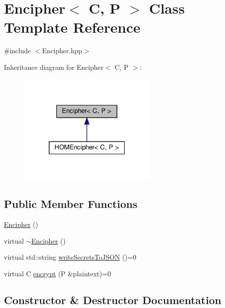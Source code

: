 \hypertarget{classEncipher}{}\section{Encipher$<$ C, P $>$ Class Template Reference}
\label{classEncipher}


{\ttfamily \#include $<$Encipher.\+hpp$>$}



Inheritance diagram for Encipher$<$ C, P $>$\+:
\nopagebreak
\begin{figure}[H]
\begin{center}
\leavevmode
\includegraphics[width=196pt]{classEncipher__inherit__graph}
\end{center}
\end{figure}
\subsection*{Public Member Functions}
\begin{DoxyCompactItemize}
\item 
\hyperlink{classEncipher_a0d082b8ecd382929d4592e094c0028a6}{Encipher} ()
\item 
virtual \hyperlink{classEncipher_a0960dbd85f3b203438e16d2027e557fa}{$\sim$\+Encipher} ()
\item 
virtual std\+::string \hyperlink{classEncipher_a27d3efa1e364c1f0d7def65454c61b85}{write\+Secrets\+To\+J\+S\+ON} ()=0
\item 
virtual C \hyperlink{classEncipher_aaf8138eb280608bfd03c6eb762ffc010}{encrypt} (P \&plaintext)=0
\end{DoxyCompactItemize}


\subsection{Constructor \& Destructor Documentation}
\mbox{\label{classEncipher_a0d082b8ecd382929d4592e094c0028a6}} 
